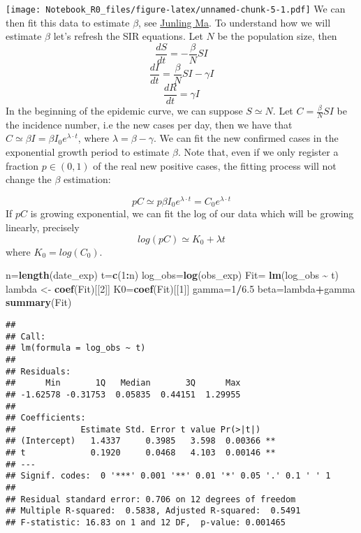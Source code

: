 \documentclass[
]{article}
\newenvironment{Shaded}{\begin{snugshade}}{\end{snugshade}}
\newcommand{\DecValTok}[1]{\textcolor[rgb]{0.00,0.00,0.81}{#1}}
\newcommand{\FloatTok}[1]{\textcolor[rgb]{0.00,0.00,0.81}{#1}}
\newcommand{\FunctionTok}[1]{\textcolor[rgb]{0.13,0.29,0.53}{\textbf{#1}}}
\newcommand{\NormalTok}[1]{#1}
\newcommand{\OtherTok}[1]{\textcolor[rgb]{0.56,0.35,0.01}{#1}}
\newcommand{\SpecialCharTok}[1]{\textcolor[rgb]{0.81,0.36,0.00}{\textbf{#1}}}
\begin{document}
\texttt{[image: Notebook\_R0\_files/figure-latex/unnamed-chunk-5-1.pdf]}
We can then fit this data to estimate \(\beta\), see
\href{https://doi.org/10.1016/j.idm.2019.12.009}{Junling Ma}. To
understand how we will estimate \(\beta\) let's refresh the SIR
equations. Let \(N\) be the population size, then
\[ \frac{dS}{dt} = -\frac \beta N SI\]
\[ \frac{dI}{dt} = \frac \beta N SI-\gamma I \]
\[ \frac{dR}{dt} = \gamma I \] In the beginning of the epidemic curve,
we can suppose \(S \simeq N\). Let \(C=\frac \beta N SI\) be the
incidence number, i.e the new cases per day, then we have that
\(C\simeq \beta I=\beta I_0e^{\lambda \cdot t}\), where
\(\lambda= \beta-\gamma\). We can fit the new confirmed cases in the
exponential growth period to estimate \(\beta\). Note that, even if we
only register a fraction \(p\in (0,1)\) of the real new positive cases,
the fitting process will not change the \(\beta\) estimation:

\[pC\simeq p\beta I_0e^{\lambda \cdot t}= C_0 e^{\lambda \cdot t}\] If
\(pC\) is growing exponential, we can fit the log of our data which will
be growing linearly, precisely \[log(pC)\simeq K_0 +\lambda t\] where
\(K_0=log(C_0)\).

\begin{Shaded}
\begin{Highlighting}[]
\NormalTok{n}\OtherTok{=}\FunctionTok{length}\NormalTok{(date\_exp)}
\NormalTok{t}\OtherTok{=}\FunctionTok{c}\NormalTok{(}\DecValTok{1}\SpecialCharTok{:}\NormalTok{n)}
\NormalTok{log\_obs}\OtherTok{=}\FunctionTok{log}\NormalTok{(obs\_exp)}
\NormalTok{Fit}\OtherTok{=} \FunctionTok{lm}\NormalTok{(log\_obs }\SpecialCharTok{\textasciitilde{}}\NormalTok{ t)}
\NormalTok{lambda }\OtherTok{\textless{}{-}} \FunctionTok{coef}\NormalTok{(Fit)[[}\DecValTok{2}\NormalTok{]]}
\NormalTok{K0}\OtherTok{=}\FunctionTok{coef}\NormalTok{(Fit)[[}\DecValTok{1}\NormalTok{]]}
\NormalTok{gamma}\OtherTok{=}\DecValTok{1}\SpecialCharTok{/}\FloatTok{6.5}
\NormalTok{beta}\OtherTok{=}\NormalTok{lambda}\SpecialCharTok{+}\NormalTok{gamma}
\FunctionTok{summary}\NormalTok{(Fit)}
\end{Highlighting}
\end{Shaded}

\begin{verbatim}
## 
## Call:
## lm(formula = log_obs ~ t)
## 
## Residuals:
##      Min       1Q   Median       3Q      Max 
## -1.62578 -0.31753  0.05835  0.44151  1.29955 
## 
## Coefficients:
##             Estimate Std. Error t value Pr(>|t|)   
## (Intercept)   1.4337     0.3985   3.598  0.00366 **
## t             0.1920     0.0468   4.103  0.00146 **
## ---
## Signif. codes:  0 '***' 0.001 '**' 0.01 '*' 0.05 '.' 0.1 ' ' 1
## 
## Residual standard error: 0.706 on 12 degrees of freedom
## Multiple R-squared:  0.5838, Adjusted R-squared:  0.5491 
## F-statistic: 16.83 on 1 and 12 DF,  p-value: 0.001465
\end{verbatim}
\end{document}
